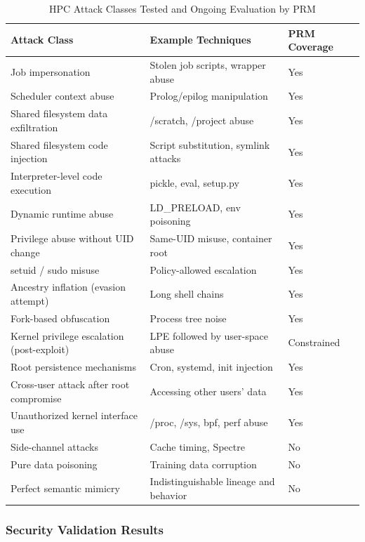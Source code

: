 \documentclass[]{sn-jnl}
\begin{document}
\begin{table}[htbp]
\centering
\caption{HPC Attack Classes Tested and Ongoing Evaluation by PRM}
\label{tab:attack_coverage_comprehensive}
\begin{tabular}{@{}p{4.5cm}p{4.5cm}p{2cm}@{}}
\toprule
\textbf{Attack Class} & \textbf{Example Techniques} & \textbf{PRM Coverage} \\
\midrule
Job impersonation & Stolen job scripts, wrapper abuse & Yes \\
Scheduler context abuse & Prolog/epilog manipulation & Yes \\
Shared filesystem data exfiltration & /scratch, /project abuse & Yes \\
Shared filesystem code injection & Script substitution, symlink attacks & Yes \\
Interpreter-level code execution & pickle, eval, setup.py & Yes \\
Dynamic runtime abuse & LD\_PRELOAD, env poisoning & Yes \\
Privilege abuse without UID change & Same-UID misuse, container root & Yes \\
setuid / sudo misuse & Policy-allowed escalation & Yes \\
Ancestry inflation (evasion attempt) & Long shell chains & Yes \\
Fork-based obfuscation & Process tree noise & Yes \\
\midrule
Kernel privilege escalation (post-exploit) & LPE followed by user-space abuse & Constrained \\
Root persistence mechanisms & Cron, systemd, init injection & Yes \\
Cross-user attack after root compromise & Accessing other users' data & Yes \\
Unauthorized kernel interface use & /proc, /sys, bpf, perf abuse & Yes \\
\midrule
Side-channel attacks & Cache timing, Spectre & No \\
Pure data poisoning & Training data corruption & No \\
Perfect semantic mimicry & Indistinguishable lineage and behavior & No \\
\bottomrule
\end{tabular}
\end{table}

\subsubsection{Security Validation Results}
\end{document}
